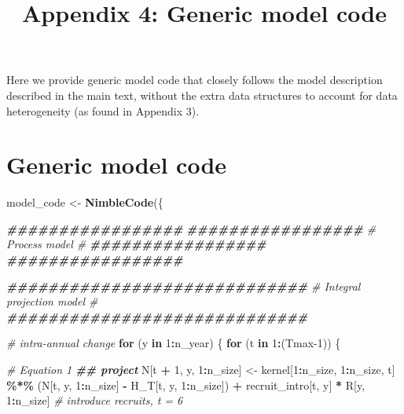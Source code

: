 \documentclass[
]{article}
\title{Appendix 4: Generic model code}
\author{}
\date{\vspace{-2.5em}}
\newenvironment{Shaded}{\begin{snugshade}}{\end{snugshade}}
\newcommand{\CommentTok}[1]{\textcolor[rgb]{0.56,0.35,0.01}{\textit{#1}}}
\newcommand{\ControlFlowTok}[1]{\textcolor[rgb]{0.13,0.29,0.53}{\textbf{#1}}}
\newcommand{\DecValTok}[1]{\textcolor[rgb]{0.00,0.00,0.81}{#1}}
\newcommand{\DocumentationTok}[1]{\textcolor[rgb]{0.56,0.35,0.01}{\textbf{\textit{#1}}}}
\newcommand{\FunctionTok}[1]{\textcolor[rgb]{0.13,0.29,0.53}{\textbf{#1}}}
\newcommand{\NormalTok}[1]{#1}
\newcommand{\OtherTok}[1]{\textcolor[rgb]{0.56,0.35,0.01}{#1}}
\newcommand{\SpecialCharTok}[1]{\textcolor[rgb]{0.81,0.36,0.00}{\textbf{#1}}}
\begin{document}
\maketitle

Here we provide generic model code that closely follows the model
description described in the main text, without the extra data
structures to account for data heterogeneity (as found in Appendix 3).

\section{Generic model code}\label{generic-model-code}

\begin{Shaded}
\begin{Highlighting}[]
\NormalTok{model\_code }\OtherTok{\textless{}{-}} \FunctionTok{NimbleCode}\NormalTok{(\{}
  
  \DocumentationTok{\#\#\#\#\#\#\#\#\#\#\#\#\#\#\#\#\#}
  \DocumentationTok{\#\#\#\#\#\#\#\#\#\#\#\#\#\#\#\#\#}
  \CommentTok{\# Process model \#}
  \DocumentationTok{\#\#\#\#\#\#\#\#\#\#\#\#\#\#\#\#\#}
  \DocumentationTok{\#\#\#\#\#\#\#\#\#\#\#\#\#\#\#\#\#}
  
  \DocumentationTok{\#\#\#\#\#\#\#\#\#\#\#\#\#\#\#\#\#\#\#\#\#\#\#\#\#\#\#\#\#}
  \CommentTok{\# Integral projection model \#}
  \DocumentationTok{\#\#\#\#\#\#\#\#\#\#\#\#\#\#\#\#\#\#\#\#\#\#\#\#\#\#\#\#\#}
  
  \CommentTok{\# intra{-}annual change}
  \ControlFlowTok{for}\NormalTok{ (y }\ControlFlowTok{in} \DecValTok{1}\SpecialCharTok{:}\NormalTok{n\_year) \{}
    \ControlFlowTok{for}\NormalTok{ (t }\ControlFlowTok{in} \DecValTok{1}\SpecialCharTok{:}\NormalTok{(Tmax}\DecValTok{{-}1}\NormalTok{)) \{}
      
      \CommentTok{\# Equation 1}
      \DocumentationTok{\#\# project}
\NormalTok{      N[t }\SpecialCharTok{+} \DecValTok{1}\NormalTok{, y, }\DecValTok{1}\SpecialCharTok{:}\NormalTok{n\_size] }\OtherTok{\textless{}{-}}\NormalTok{ kernel[}\DecValTok{1}\SpecialCharTok{:}\NormalTok{n\_size, }\DecValTok{1}\SpecialCharTok{:}\NormalTok{n\_size, t] }\SpecialCharTok{\%*\%}
\NormalTok{        (N[t, y, }\DecValTok{1}\SpecialCharTok{:}\NormalTok{n\_size] }\SpecialCharTok{{-}}\NormalTok{ H\_T[t, y, }\DecValTok{1}\SpecialCharTok{:}\NormalTok{n\_size]) }\SpecialCharTok{+}
\NormalTok{        recruit\_intro[t, y] }\SpecialCharTok{*}\NormalTok{ R[y, }\DecValTok{1}\SpecialCharTok{:}\NormalTok{n\_size] }\CommentTok{\# introduce recruits, t = 6}


\end{Highlighting}
\end{Shaded}
\end{document}
